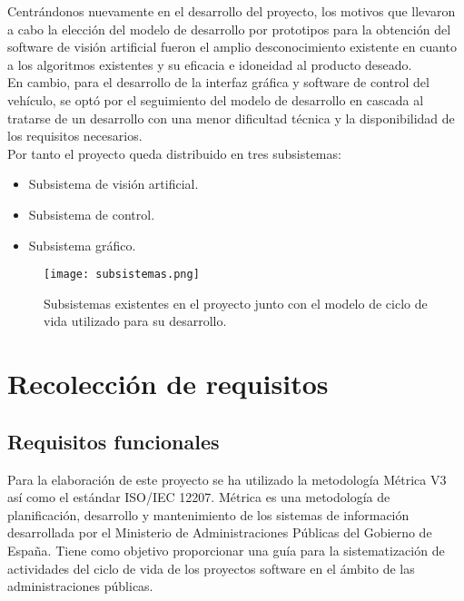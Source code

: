 Centrándonos nuevamente en el desarrollo del proyecto, los motivos que llevaron a cabo la elección del modelo de desarrollo por prototipos para la obtención del software de visión artificial fueron el amplio desconocimiento existente en cuanto a los algoritmos existentes y su eficacia e idoneidad al producto deseado. \\

En cambio, para el desarrollo de la interfaz gráfica y software de control del vehículo, se optó por el seguimiento del modelo de desarrollo en cascada al tratarse de un desarrollo con una menor dificultad técnica y la disponibilidad de los requisitos necesarios.\\

Por tanto el proyecto queda distribuido en tres subsistemas:

\begin{itemize}
\item Subsistema de visión artificial.
\item Subsistema de control.
\item Subsistema gráfico.
\end{itemize}


\begin{figure}[H]
  \begin{center}
    \texttt{[image: subsistemas.png]}
  \end{center}
  \caption{Subsistemas existentes en el proyecto junto con el modelo de ciclo de vida utilizado para su desarrollo.}
  \label{subsistemas}
\end{figure}

\section{Recolección de requisitos}

\subsection{Requisitos funcionales}

Para la elaboración de este proyecto se ha utilizado la metodología Métrica V3 así como el estándar ISO/IEC 12207. Métrica es una metodología de planificación, desarrollo y mantenimiento de los sistemas de información desarrollada por el Ministerio de Administraciones Públicas del Gobierno de España. Tiene como objetivo proporcionar una guía para la sistematización de actividades del ciclo de vida de los proyectos software en el ámbito de las administraciones públicas.\\

